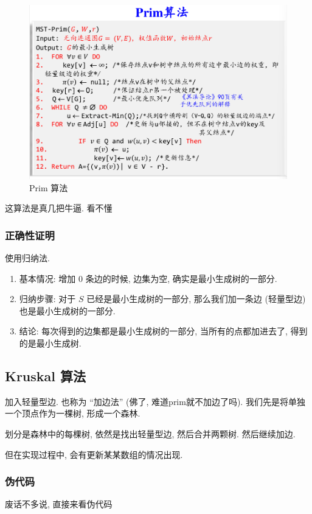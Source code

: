 \documentclass[a4paper, 10pt]{ctexart} %
\begin{document}
\begin{figure}[H]
    \centering
    \includegraphics[scale = 0.5]{7.png}
    \caption[]{Prim 算法}
\end{figure}

这算法是真几把牛逼. 看不懂
\subsubsection{正确性证明}
使用归纳法. 
\begin{enumerate}
    \item 
基本情况: 增加 $0$ 条边的时候, 边集为空, 确实是最小生成树的一部分.
\item
归纳步骤: 
对于 $S$ 已经是最小生成树的一部分, 
那么我们加一条边 (轻量型边) 也是最小生成树的一部分. 
\item
结论: 每次得到的边集都是最小生成树的一部分, 当所有的点都加进去了, 得到的是最小生成树.
\end{enumerate}


\subsection{Kruskal 算法}
加入轻量型边. 也称为 ``加边法'' (佛了, 难道prim就不加边了吗). 
我们先是将单独一个顶点作为一棵树, 形成一个森林. 

划分是森林中的每棵树, 依然是找出轻量型边, 然后合并两颗树. 然后继续加边.

但在实现过程中, 会有更新某某数组的情况出现. 
\subsubsection{伪代码}
废话不多说, 直接来看伪代码
\end{document}
